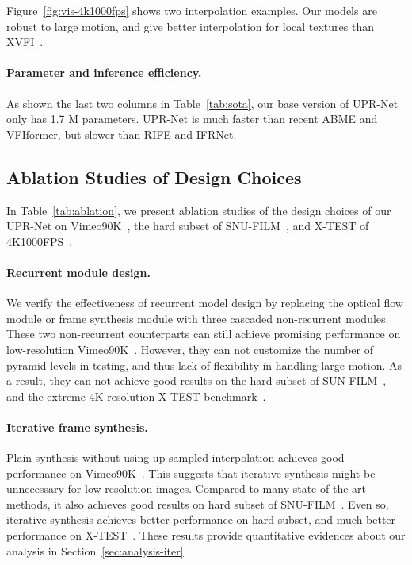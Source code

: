 \documentclass[10pt,twocolumn,letterpaper]{article}
\begin{document}
Figure~\ref{fig:vis-4k1000fps} shows two interpolation examples. Our models are
robust to large motion, and give better interpolation for local textures than
XVFI~\cite{sim2021xvfi}.


\paragraph{Parameter and inference efficiency.} As shown the last two columns in
Table~\ref{tab:sota}, our base version of UPR-Net only has 1.7 M parameters.
UPR-Net is much faster than recent ABME and VFIformer, but slower than RIFE and
IFRNet.


\subsection{Ablation Studies of Design Choices}

In Table~\ref{tab:ablation}, we present ablation studies of the design choices
of our UPR-Net on Vimeo90K~\cite{xue2019video}, the hard subset of
SNU-FILM~\cite{choi2020channel}, and X-TEST of 4K1000FPS~\cite{sim2021xvfi}.


\paragraph{Recurrent module design.} We verify the effectiveness of recurrent
model design by replacing the optical flow module or frame synthesis module with
three cascaded non-recurrent modules.  These two non-recurrent counterparts can
still achieve promising performance on low-resolution
Vimeo90K~\cite{xue2019video}.  However, they can not customize the number of
pyramid levels in testing, and thus lack of flexibility in handling large
motion. As a result, they can not achieve good results on the hard subset of
SUN-FILM~\cite{choi2020channel}, and the extreme 4K-resolution X-TEST
benchmark~\cite{sim2021xvfi}.


\paragraph{Iterative frame synthesis.} Plain synthesis without using up-sampled
interpolation achieves good performance on Vimeo90K~\cite{xue2019video}.
This suggests that iterative synthesis might be unnecessary for low-resolution
images.  Compared to many state-of-the-art methods, it also achieves good
results on hard subset of SNU-FILM~\cite{choi2020channel}. Even so, iterative
synthesis achieves better performance on hard subset, and much better
performance on X-TEST~\cite{sim2021xvfi}.  These results provide quantitative
evidences about our analysis in Section~\ref{sec:analysis-iter}.
\end{document}

